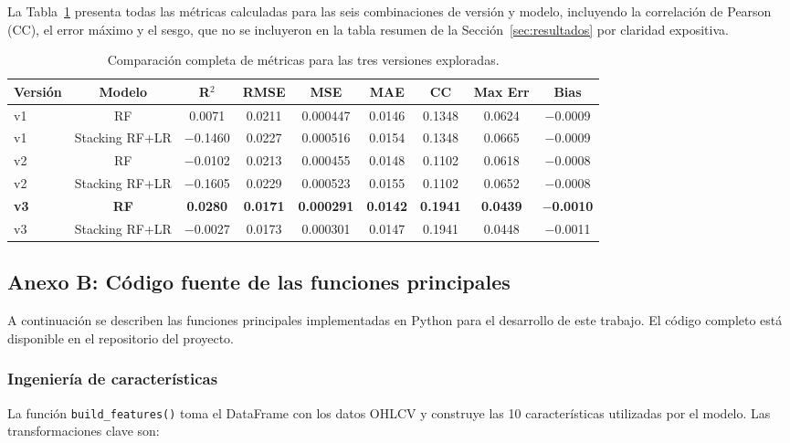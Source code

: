 \documentclass[12pt,a4paper]{article}
\begin{document}
La Tabla~\ref{tab:anexo_metricas} presenta todas las métricas calculadas para las seis combinaciones de versión y modelo, incluyendo la correlación de Pearson (CC), el error máximo y el sesgo, que no se incluyeron en la tabla resumen de la Sección~\ref{sec:resultados} por claridad expositiva.

\begin{table}[H]
\centering
\caption{Comparación completa de métricas para las tres versiones exploradas.}
\label{tab:anexo_metricas}
\small
\begin{tabular}{lcccccccc}
\toprule
\textbf{Versión} & \textbf{Modelo} & \textbf{R$^{2}$} & \textbf{RMSE} & \textbf{MSE} & \textbf{MAE} & \textbf{CC} & \textbf{Max Err} & \textbf{Bias} \\
\midrule
v1 & RF & 0.0071 & 0.0211 & 0.000447 & 0.0146 & 0.1348 & 0.0624 & $-$0.0009 \\
v1 & Stacking RF+LR & $-$0.1460 & 0.0227 & 0.000516 & 0.0154 & 0.1348 & 0.0665 & $-$0.0009 \\
v2 & RF & $-$0.0102 & 0.0213 & 0.000455 & 0.0148 & 0.1102 & 0.0618 & $-$0.0008 \\
v2 & Stacking RF+LR & $-$0.1605 & 0.0229 & 0.000523 & 0.0155 & 0.1102 & 0.0652 & $-$0.0008 \\
\textbf{v3} & \textbf{RF} & \textbf{0.0280} & \textbf{0.0171} & \textbf{0.000291} & \textbf{0.0142} & \textbf{0.1941} & \textbf{0.0439} & \textbf{$-$0.0010} \\
v3 & Stacking RF+LR & $-$0.0027 & 0.0173 & 0.000301 & 0.0147 & 0.1941 & 0.0448 & $-$0.0011 \\
\bottomrule
\end{tabular}
\end{table}

\subsection{Anexo B: Código fuente de las funciones principales}

A continuación se describen las funciones principales implementadas en Python para el desarrollo de este trabajo. El código completo está disponible en el repositorio del proyecto.

\subsubsection{Ingeniería de características}

La función \texttt{build\_features()} toma el DataFrame con los datos OHLCV y construye las 10 características utilizadas por el modelo. Las transformaciones clave son:
\end{document}

